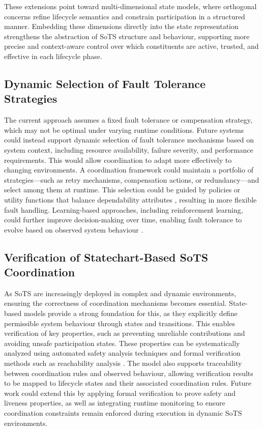 These extensions point toward multi-dimensional state models, where orthogonal concerns refine lifecycle semantics and constrain participation in a structured manner. Embedding these dimensions directly into the state representation strengthens the abstraction of SoTS structure and behaviour, supporting more precise and context-aware control over which constituents are active, trusted, and effective in each lifecycle phase.

\subsection{Dynamic Selection of Fault Tolerance Strategies}

The current approach assumes a fixed fault tolerance or compensation strategy, which may not be optimal under varying runtime conditions. Future systems could instead support dynamic selection of fault tolerance mechanisms based on system context, including resource availability, failure severity, and performance requirements. This would allow coordination to adapt more effectively to changing environments. A coordination framework could maintain a portfolio of strategies---such as retry mechanisms, compensation actions, or redundancy---and select among them at runtime. This selection could be guided by policies or utility functions that balance dependability attributes \cite{avizienis2004basic}, resulting in more flexible fault handling. Learning-based approaches, including reinforcement learning, could further improve decision-making over time, enabling fault tolerance to evolve based on observed system behaviour \cite{dong2023deep, zhang2020fault}.




\subsection{Verification of Statechart-Based SoTS Coordination}

As SoTS are increasingly deployed in complex and dynamic environments, ensuring the correctness of coordination mechanisms becomes essential. State-based models provide a strong foundation for this, as they explicitly define permissible system behaviour through states and transitions. This enables verification of key properties, such as preventing unreliable contributions and avoiding unsafe participation states. These properties can be systematically analyzed using automated safety analysis techniques \cite{pap2005methods} and formal verification methods such as reachability analysis \cite{kang1996formalization}. The model also supports traceability between coordination rules and observed behaviour, allowing verification results to be mapped to lifecycle states and their associated coordination rules. Future work could extend this by applying formal verification to prove safety and liveness properties, as well as integrating runtime monitoring to ensure coordination constraints remain enforced during execution in dynamic SoTS environments.




